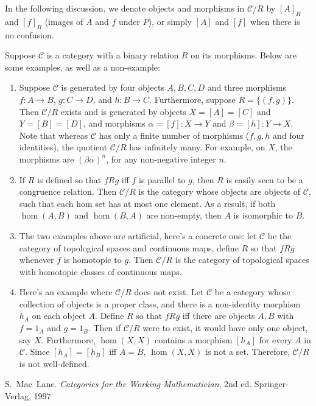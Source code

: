 \documentclass[12pt]{article}
\begin{document}
In the following discussion, we denote objects and morphisms in $\mathcal{C}/R$ by $[A]_R$ and $[f]_R$ (images of $A$ and $f$ under $P$), or simply $[A]$ and $[f]$ when there is no confusion.

Suppose $\mathcal{C}$ is a category with a binary relation $R$ on its morphisms.  Below are some examples, as well as a non-example:
\begin{enumerate}
\item Suppose $\mathcal{C}$ is generated by four objects $A,B,C,D$ and three morphisms $f:A\to B$, $g:C\to D$, and $h: B\to C$.  Furthermore, suppose $R=\lbrace (f,g)\rbrace$.  Then $\mathcal{C}/R$ exists and is generated by objects $X=[A]=[C]$ and $Y=[B]=[D]$, and morphisms $\alpha=[f]:X\to Y$ and $\beta=[h]:Y\to X$.  Note that whereas $\mathcal{C}$ has only a finite number of morphisms ($f,g,h$ and four identities), the quotient $\mathcal{C}/R$ has infinitely many.  For example, on $X$, the morphisms are $(\beta\alpha)^n$, for any non-negative integer $n$.
\item If $R$ is defined so that $f R g$ iff $f$ is parallel to $g$, then $R$ is easily seen to be a congruence relation.  Then $\mathcal{C}/R$ is the category whose objects are objects of $\mathcal{C}$, such that each hom set has at most one element.  As a result, if both $\hom(A,B)$ and $\hom(B,A)$ are non-empty, then $A$ is isomorphic to $B$.
\item The two examples above are artificial, here's a concrete one: let $\mathcal{C}$ be the category of topological spaces and continuous maps, define $R$ so that $f R g$ whenever $f$ is homotopic to $g$.  Then $\mathcal{C}/R$ is the category of topological spaces with homotopic classes of continuous maps.
\item Here's an example where $\mathcal{C}/R$ does not exist.  Let $\mathcal{C}$ be a category whose collection of objects is a proper class, and there is a non-identity morphism $h_A$ on each object $A$.  Define $R$ so that $f R g$ iff there are objects $A,B$ with $f=1_A$ and $g=1_B$.  Then if $\mathcal{C}/R$ were to exist, it would have only one object, say $X$.  Furthermore, $\hom(X,X)$ contains a morphism $[h_A]$ for every $A$ in $\mathcal{C}$.  Since $[h_A]=[h_B]$ iff $A=B$, $\hom(X,X)$ is not a set.  Therefore, $\mathcal{C}/R$ is not well-defined.
\end{enumerate}

\begin{thebibliography}{99}
 S.~Mac~Lane. {\it Categories for the Working Mathematician}, 2nd ed. Springer-Verlag, 1997
\end{thebibliography}
\end{document}
